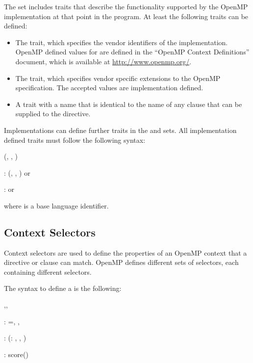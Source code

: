 The  set includes traits that describe the functionality 
supported by the OpenMP implementation at that point in the program. At least 
the following traits can be defined:

\begin{itemize}
\item The  trait, which specifies the vendor
      identifiers of the implementation. OpenMP defined values for 
      are defined in the ``OpenMP Context Definitions'' document, which is
      available at \url{http://www.openmp.org/}.
\item The  trait, which specifies vendor
      specific extensions to the OpenMP specification. The accepted
       values are implementation defined.
\item A trait with a name that is identical to the name of any clause that can be
      supplied to the  directive.
\end{itemize}

Implementations can define further traits in the  and 
sets. All implementation defined traits must follow the following syntax:

\begin{ompSyntax}
\plc{identifier[}(\plc{context-element[}, \plc{context-element[}, \plc{...]]})\plc{]}

:
  \plc{identifier[}(\plc{context-element[}, \plc{context-element[}, \plc{...]]})\plc{]}
  or

:
  or
\end{ompSyntax}

where  is a base language identifier.

\subsection{Context Selectors}
\label{subsec:Context Selectors}

Context selectors are used to define the properties of an OpenMP context that
a directive or clause can match. OpenMP defines different sets of selectors, 
each containing different selectors.

The syntax to define a  is the following:

\begin{ompSyntax}
\plc{trait-set-selector[},\plc{trait-set-selector[},\plc{...]]}

:
   ={\plc{trait-selector[}, \plc{trait-selector[}, \plc{...]]}}

:
   \plc{trait-selector-name[}(\plc{[trait-score}: \plc{]} \plc{trait-property[}, \plc{trait-property[}, \plc{...]]})\plc{]}

:
    score()
\end{ompSyntax}

